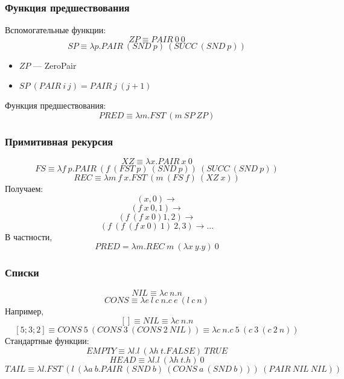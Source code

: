 \documentclass[xetex,mathserif,serif]{beamer}
\begin{document}
    \begin{frame}
        \frametitle{Функция предшествования}
        Вспомогательные функции:
        $$ZP \equiv PAIR\ 0\ 0$$
        $$SP \equiv \lambda p.PAIR\ (SND\ p)\ (SUCC\ (SND\ p))$$
        \begin{itemize}
            \item $ZP$ --- ZeroPair
            \item $SP\ (PAIR\ i\ j) = PAIR\ j\ (j + 1)$
        \end{itemize}

        \vspace{3mm}

        Функция предшествования:
        $$PRED \equiv \lambda m.FST\ (m\ SP\ ZP)$$
    \end{frame}

    \begin{frame}
        \frametitle{Примитивная рекурсия}
        $$XZ \equiv \lambda x.PAIR\ x\ 0$$
        $$FS \equiv \lambda f\ p.PAIR\ (f\ (FST\ p)\ (SND\ p))\ (SUCC\ (SND\ p))$$
        $$REC \equiv \lambda m\ f\ x.FST\ (m\ (FS\ f)\ (XZ\ x))$$
        Получаем:
        $$(x, 0) \rightarrow$$
        $$(f\ x\ 0, 1) \rightarrow$$
        $$(f\ (f\ x\ 0) 1, 2) \rightarrow$$
        $$(f\ (f\ (f\ x\ 0)\ 1)\ 2, 3) \rightarrow ...$$
        В частности, 
        $$PRED = \lambda m.REC\ m\ (\lambda x\ y.y)\ 0$$
    \end{frame}

    \begin{frame}
        \frametitle{Списки}
        $$NIL \equiv \lambda c\ n.n$$
        $$CONS \equiv \lambda e\ l\ c\ n.c\ e\ (l\ c\ n)$$
        Например,
        $$[] \equiv NIL \equiv \lambda c\ n.n$$
        $$[5; 3; 2] \equiv CONS\ 5\ (CONS\ 3\ (CONS\ 2\ NIL)) \equiv \lambda c\ n.c\ 5\ (c\ 3\ (c\ 2\ n))$$
        Стандартные функции:
        $$EMPTY \equiv \lambda l.l\ (\lambda h\ t.FALSE)\ TRUE$$
        $$HEAD \equiv \lambda l.l\ (\lambda h\ t.h)\ 0$$
        $$TAIL \equiv \lambda l.FST\ (l\ (\lambda a\ b.PAIR\ (SND\ b)\ (CONS\ a\ (SND\ b)))\ (PAIR\ NIL\ NIL))$$
    \end{frame}
\end{document}
